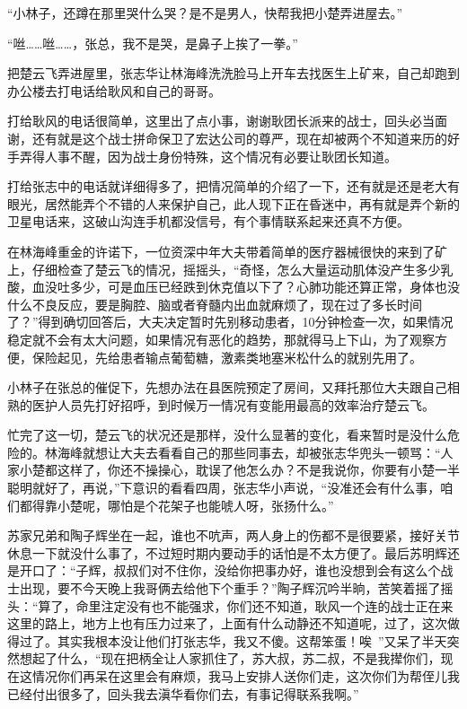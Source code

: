 “小林子，还蹲在那里哭什么哭？是不是男人，快帮我把小楚弄进屋去。”

“咝……咝……，张总，我不是哭，是鼻子上挨了一拳。”

把楚云飞弄进屋里，张志华让林海峰洗洗脸马上开车去找医生上矿来，自己却跑到办公楼去打电话给耿风和自己的哥哥。

打给耿风的电话很简单，这里出了点小事，谢谢耿团长派来的战士，回头必当面谢，还有就是这个战士拼命保卫了宏达公司的尊严，现在却被两个不知道来历的好手弄得人事不醒，因为战士身份特殊，这个情况有必要让耿团长知道。

打给张志中的电话就详细得多了，把情况简单的介绍了一下，还有就是还是老大有眼光，居然能弄个不错的人来保护自己，此人现下正在昏迷中，再有就是弄个新的卫星电话来，这破山沟连手机都没信号，有个事情联系起来还真不方便。

在林海峰重金的许诺下，一位资深中年大夫带着简单的医疗器械很快的来到了矿上，仔细检查了楚云飞的情况，摇摇头，“奇怪，怎么大量运动肌体没产生多少乳酸，血没吐多少，可是血压已经跌到休克值以下了？心肺功能还算正常，身体也没什么不良反应，要是胸腔、脑或者脊髓内出血就麻烦了，现在过了多长时间了？”得到确切回答后，大夫决定暂时先别移动患者，10分钟检查一次，如果情况稳定就不会有太大问题，如果情况有恶化的趋势，那就得马上下山，为了观察方便，保险起见，先给患者输点葡萄糖，激素类地塞米松什么的就别先用了。

小林子在张总的催促下，先想办法在县医院预定了房间，又拜托那位大夫跟自己相熟的医护人员先打好招呼，到时候万一情况有变能用最高的效率治疗楚云飞。

忙完了这一切，楚云飞的状况还是那样，没什么显著的变化，看来暂时是没什么危险的。林海峰就想让大夫去看看自己的那些同事去，却被张志华兜头一顿骂：“人家小楚都这样了，你还不操操心，耽误了他怎么办？不是我说你，你要有小楚一半聪明就好了，再说，”下意识的看看四周，张志华小声说，“没准还会有什么事，咱们都得靠小楚呢，哪怕是个花架子也能唬人呀，张扬什么。”

苏家兄弟和陶子辉坐在一起，谁也不吭声，两人身上的伤都不是很要紧，接好关节休息一下就没什么事了，不过短时期内要动手的话怕是不太方便了。最后苏明辉还是开口了：“子辉，叔叔们对不住你，没给你把事办好，谁也没想到会有这么个战士出现，要不今天晚上我哥俩去给他下个重手？”陶子辉沉吟半晌，苦笑着摇了摇头：“算了，命里注定没有也不能强求，你们还不知道，耿风一个连的战士正在来这里的路上，地方上也有压力过来了，上面有什么动静还不知道呢，过了，这次做得过了。其实我根本没让他们打张志华，我又不傻。这帮笨蛋！唉~”又呆了半天突然想起了什么，“现在把柄全让人家抓住了，苏大叔，苏二叔，不是我撵你们，现在这情况你们再呆在这里会有麻烦，我马上安排人送你们走，这次你们为帮侄儿我已经付出很多了，回头我去滇华看你们去，有事记得联系我啊。”

